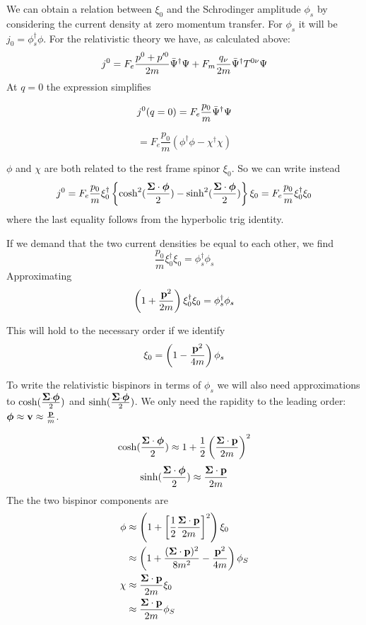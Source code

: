 We can obtain a relation between $\xi_0$ and the Schrodinger amplitude $\phi_s$ by considering the current density at zero momentum transfer.  For $\phi_s$ it will be $j_0 =  \phi_s^\dagger \phi$.  For the relativistic theory we have, as calculated above:
\[
	j^0 = F_e \frac{p^0 + p'^0}{2m} \bar{\Psi}^\dagger \Psi + F_m 	\frac{q_\nu}{2m} \bar{\Psi}^\dagger T^{0\nu} \Psi	
\]
At $q=0$ the expression simplifies

\[
	j^0(q=0) = F_e \frac{p_0}{m} \bar{\Psi}^\dagger \Psi
\]

\[
	= F_e  \frac{p_0}{m}( \phi^\dagger \phi - \chi^\dagger \chi )
\]

$\phi$ and $\chi$ are both related to the rest frame spinor $\xi_0$.  So we can write instead
\[
	j^0 = F_e \frac{p_0}{m} \xi_0^\dagger \left \{ 
		\cosh^2( \frac{\mbox{\boldmath$ \Sigma $} \cdot \mbox{\boldmath$ \phi $} }{2})
		- \sinh^2( \frac{\mbox{\boldmath$ \Sigma $} \cdot \mbox{\boldmath$ \phi $} }{2})
	\right \} \xi_0  
		=	F_e \frac{p_0}{m} \xi_0^\dagger \xi_0
\]
where the last equality follows from the hyperbolic trig identity.


If we demand that the two current densities be equal to each other, we find
\[
	\frac{p_0}{m} \xi_0^\dagger \xi_0 = \phi_s^\dagger \phi_s
\]
Approximating
\[
	\left( 1 + \frac{\mathbf{p}^2}{2m} \right) \xi_0^\dagger \xi_0 = \phi_s^\dagger \phi_s
\]

This will hold to the necessary order if we identify
\[
	\xi_0 = \left( 1 - \frac{\mathbf{p}^2}{4m} \right) \phi_s
\]



To write the relativistic bispinors in terms of $\phi_s$ we will also need approximations to $\cosh( \frac{\mbox{\boldmath$ \Sigma $} \cdot \mbox{\boldmath$ \phi $} }{2})$ and $\sinh( \frac{\mbox{\boldmath$ \Sigma $} \cdot \mbox{\boldmath$ \phi $} }{2})$.  We only need the rapidity to the leading order: $\mbox{\boldmath$ \phi $} \approx \mathbf{v} \approx \frac{\mathbf{p} }{m}$. 

\[
	\cosh( \frac{\mbox{\boldmath$ \Sigma $} \cdot \mbox{\boldmath$ \phi $} }{2}) 
		\approx 1 + \frac{1}{2}\left( \frac{\mbox{\boldmath$ \Sigma $} \cdot \mathbf{p} }{2m} \right)^2
\]
\[
	\sinh( \frac{\mbox{\boldmath$ \Sigma $} \cdot \mbox{\boldmath$ \phi $} }{2}) 
		\approx   \frac{\mbox{\boldmath$ \Sigma $} \cdot \mathbf{p} }{2m}
\]
The the two bispinor components are
\begin{align}
\phi 
	&\approx  \left(  1 + \left[ \frac{1}{2}\frac{\mbox{\boldmath$ \Sigma $} \cdot \mathbf{p} }{2m} \right]^2 \right) \xi_0 \notag \\
	&\approx  \left(  1 + \frac{(\mbox{\boldmath$ \Sigma $} \cdot \mathbf{p})^2 }{8m^2} - \frac{\mathbf{p}^2}{4m} \right ) \phi_S	 \label{eq:nrPhi} \\
 \chi
 	&\approx	\frac{\mbox{\boldmath$ \Sigma $} \cdot \mathbf{p} }{2m} \xi_0 \notag \\
 	&\approx	\frac{\mbox{\boldmath$ \Sigma $} \cdot \mathbf{p} }{2m} \phi_S  \label{eq:nrChi}
\end{align}





